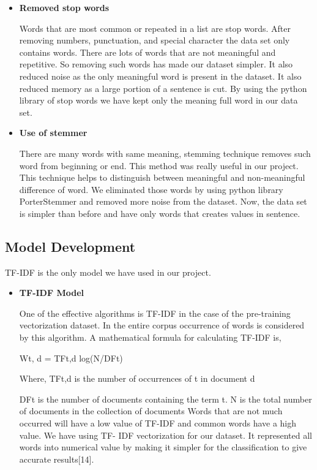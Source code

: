 \documentclass[conference]{IEEEtran}
\begin{document}
\begin{itemize}
\vspace{12pt}

\item \textbf{Removed stop words}


Words that are most common or repeated in a list are stop words. After removing numbers, punctuation, and special character the data set only contains words. There are lots of words that are not meaningful and repetitive. So removing such words has made our dataset simpler. It also reduced noise as the only meaningful word is present in the dataset. It also reduced memory as a large portion of a sentence is cut. By using the python library of stop words we have kept only the meaning full word in our data set. 


\item \textbf{Use of stemmer}


There are many words with same meaning, stemming technique removes such word from beginning or end. This method was really useful in our project. This technique helps to distinguish between meaningful and non-meaningful difference of word. We eliminated those words by using python library PorterStemmer and removed more noise from the dataset. Now, the data set is simpler than before and have only words that creates values in sentence.

\end{itemize}



\subsection{Model Development}
TF-IDF is the only model we have used in our project.

\begin{itemize}

\item \textbf{TF-IDF Model}


One of the effective algorithms is TF-IDF in the case of the pre-training vectorization dataset. In the entire corpus occurrence of words is considered by this algorithm. A mathematical formula for calculating TF-IDF is, 



Wt, d = TFt,d log(N/DFt) 



Where, TFt,d is the number of occurrences of t in document d 



 DFt is the number of documents containing the term t. 
N is the total number of documents in the collection of documents
Words that are not much occurred will have a low value of TF-IDF and common words have a high value. We have using TF- IDF vectorization for our dataset. It represented all words into numerical value by making it simpler for the classification to give accurate results[14].



\end{itemize}
\end{document}
